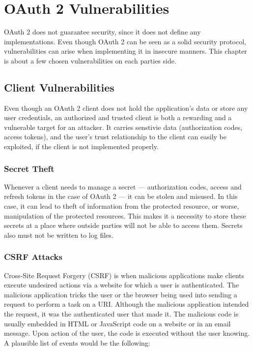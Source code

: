 \section{OAuth 2 Vulnerabilities}

OAuth 2 does not guarantee security, since it does not define any implementations. Even though OAuth 2 can be seen as a solid security protocol, vulnerabilities can arise when implementing it in insecure manners. This chapter is about a few chosen vulnerabilities on each parties side.

\subsection{Client Vulnerabilities}

Even though an OAuth 2 client does not hold the application's data or store any user credentials, an authorized and trusted client is both a rewarding and a vulnerable target for an attacker. It carries senstivie data (authorization codes, access tokens), and the user's trust relationship to the client can easily be exploited, if the client is not implemented properly.

\subsubsection{Secret Theft}

Whenever a client needs to manage a secret — authorization codes, access and refresh tokens in the case of OAuth 2 — it can be stolen and misused. In this case, it can lead to theft of information from the protected resource, or worse, manipulation of the protected resources. This makes it a necessity to store these secrets at a place where outside parties will not be able to access them. Secrets also must not be written to log files.

\subsubsection{CSRF Attacks}

Cross-Site Request Forgery (CSRF) is when malicious applications make clients execute undesired actions via a website for which a user is authenticated. The malicious application tricks the user or the browser being used into sending a request to perform a task on a URI. Although the malicious application intended the request, it was the authenticated user that made it. The malicious code is usually embedded in HTML or JavaScript code on a website or in an email message. Upon action of the user, the code is executed without the user knowing. A plausible list of events would be the following:

